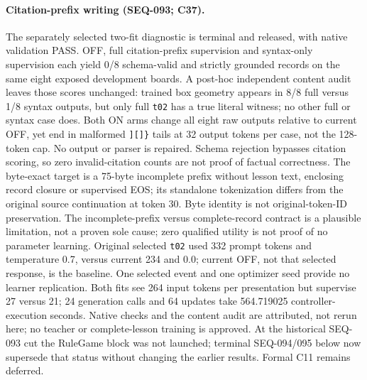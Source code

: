 \documentclass{article}
\begin{document}
\paragraph{Citation-prefix writing (SEQ-093; C37).} The separately selected two-fit diagnostic is terminal and released, with native validation PASS. OFF, full citation-prefix supervision and syntax-only supervision each yield 0/8 schema-valid and strictly grounded records on the same eight exposed development boards. A post-hoc independent content audit leaves those scores unchanged: trained box geometry appears in 8/8 full versus 1/8 syntax outputs, but only full \texttt{t02} has a true literal witness; no other full or syntax case does. Both ON arms change all eight raw outputs relative to current OFF, yet end in malformed \texttt{][]\}} tails at 32 output tokens per case, not the 128-token cap. No output or parser is repaired. Schema rejection bypasses citation scoring, so zero invalid-citation counts are not proof of factual correctness. The byte-exact target is a 75-byte incomplete prefix without lesson text, enclosing record closure or supervised EOS; its standalone tokenization differs from the original source continuation at token 30. Byte identity is not original-token-ID preservation. The incomplete-prefix versus complete-record contract is a plausible limitation, not a proven sole cause; zero qualified utility is not proof of no parameter learning. Original selected \texttt{t02} used 332 prompt tokens and temperature 0.7, versus current 234 and 0.0; current OFF, not that selected response, is the baseline. One selected event and one optimizer seed provide no learner replication. Both fits see 264 input tokens per presentation but supervise 27 versus 21; 24 generation calls and 64 updates take 564.719025 controller-execution seconds. Native checks and the content audit are attributed, not rerun here; no teacher or complete-lesson training is approved. At the historical SEQ-093 cut the RuleGame block was not launched; terminal SEQ-094/095 below now supersede that status without changing the earlier results. Formal C11 remains deferred.
\end{document}
